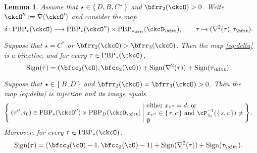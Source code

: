 \documentclass[12pt,a4paper]{amsart}
\def\DD{\nabla}
\numberwithin{equation}{section}
\newtheorem{lem}[thm]{Lemma}
\theoremstyle{remark}
\def\ssign{\mathrm{Sign}}
\def\ckcOpp{\ckcO^{\prime\prime}}
\def\ckDD{{\check\DD}}
\def\PBP{\mathrm{PBP}}
\begin{document}
\begin{lem}
\label{lem:delta}
Assume that $\star \in \set{D,B,C^*}$ and $\bfrr_2(\ckcO)>0$. Write $\ckcOpp := \ckDD(\ckcO')$ and consider the map
\begin{equation}\label{eq:delta}
  \delta  \colon \PBP_\star(\ckcO)\longrightarrow
    \PBP_\star(\ckcOpp)\times \PBP_{\star_\bftt}(\ckcO_\bftt),
    \qquad \tau \mapsto (\DD^2(\tau),\tau_\bftt).
\end{equation}
\begin{enuma}
\item Suppose that
$\star = C^*$ or $\bfrr_2(\ckcO)>\bfrr_3(\ckcO)$. Then the map \eqref{eq:delta} is a bijective, and for every $\tau\in  \PBP_\star(\ckcO) $,
\begin{equation}\label{eq:sign.D}
\ssign(\tau)
=(\bfcc_2(\cO),\bfcc_2(\cO))+\ssign(\DD^2(\tau))+\ssign(\tau_\bftt).
\end{equation}

\item Suppose that  $\star \in \set{B,D}$ and $\bfrr_2(\ckcO)=\bfrr_3(\ckcO)>0$. Then the map \eqref{eq:delta} is  injection and its  image equals
\begin{equation}\label{eq:delta.I}
    \Set{ (\tau'',\tau_0)  \in \PBP_\star(\ckcOpp)\times \PBP_D(\ckcO_\bftt)  |
      \begin{minipage}{15em}
        either
    $x_{\tau''} = d$, or \\
    $x_{\tau''}\in \set{r,c}$  and
    $\cP_{\tau_0}^{-1}(\set{s,c})\neq \emptyset$
  \end{minipage}
}.
\end{equation}
Moreover,  for every $\tau\in  \PBP_\star(\ckcO) $,
\begin{equation}\label{eq:sign.GD}
\ssign(\tau)
=(\bfcc_2(\cO)-1,\bfcc_2(\cO)-1)+\ssign(\DD^2(\tau))+\ssign(\tau_\bftt).
\end{equation}
\end{enuma}
\end{lem}
\end{document}
